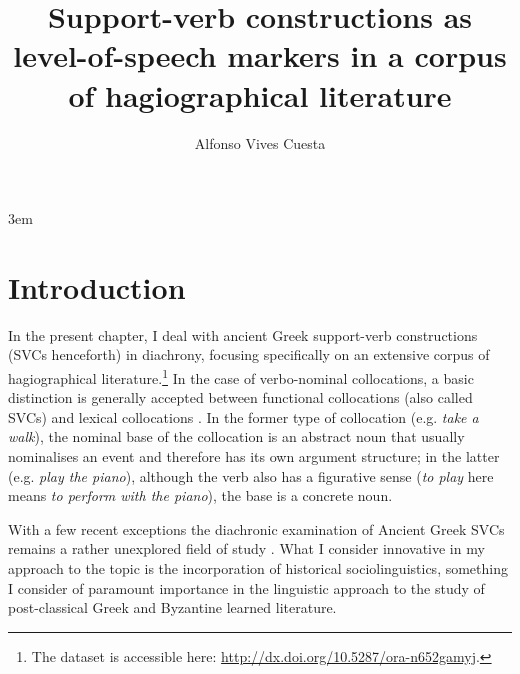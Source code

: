 \documentclass[output=paper,colorlinks,citecolor=brown]{langscibook}
\author{Alfonso Vives Cuesta\affiliation{Universidad de Valladolid / Instituto Bíblico y Oriental}}
\title[Support-verb constructions as level-of-speech markers]{Support-verb constructions as level-of-speech markers in a corpus of hagiographical   literature}
\begin{document}
\emergencystretch 3em
\maketitle


\section{Introduction}\label{sec:vc:1}

In the present chapter, I deal with ancient Greek support-verb constructions (SVCs
henceforth) in diachrony, focusing specifically on an extensive corpus of hagiographical
literature.\footnote{The dataset is accessible here: \url{http://dx.doi.org/10.5287/ora-n652gamyj}.} In the case of verbo-nominal
collocations, a basic distinction is generally accepted between functional collocations
(also called SVCs) and lexical collocations
\parencites[78]{KoikeKazumi-20011}[5]{BanosJoséMiguel-2014280}. In the former type of
collocation (e.g. \emph{take a walk}), the nominal base of the collocation is an abstract
noun that usually nominalises an event and therefore has its own argument structure; in
the latter (e.g. \emph{play the piano}), although the verb also has a figurative sense
(\emph{to play} here means \textit{to perform with the piano}), the base is a concrete noun.

With a few recent exceptions
\parencites{FendelVictoria-2021854,FendelVictoria-2023591,FendelVictoria-202382,VivesCuestaAlfonsoandMadrigalAceroLucía-2022404}
the diachronic examination of Ancient Greek SVCs remains a rather unexplored field of
study \parencite{Banos-2022595}. What I consider innovative in my approach to the topic is
the incorporation of historical sociolinguistics, something I consider of paramount
importance in the linguistic approach to the study of post-classical Greek and Byzantine
learned literature.
\end{document}
